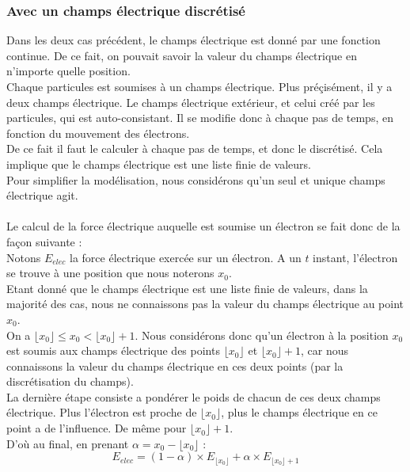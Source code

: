 \documentclass{article}
\begin{document}
\subsubsection{Avec un champs électrique discrétisé}
Dans les deux cas précédent, le champs électrique est donné par une fonction continue. De ce fait, on pouvait savoir la valeur du champs électrique en n'importe quelle position.\\
Chaque particules est soumises à un champs électrique. Plus préçisément, il y a deux champs électrique. Le champs électrique extérieur, et celui créé par les particules, qui est auto-consistant. Il se modifie donc à chaque pas de temps, en fonction du mouvement des électrons.\\
De ce fait il faut le calculer à chaque pas de temps, et donc le discrétisé. Cela implique que le champs électrique est une liste finie de valeurs.\\
Pour simplifier la modélisation, nous considérons qu'un seul et unique champs électrique agit.\\
\\
Le calcul de la force électrique auquelle est soumise un électron se fait donc de la façon suivante :\\
Notons $E_{elec}$ la force électrique exercée sur un électron. A un $t$ instant, l'électron se trouve à une position que nous noterons $x_0$.\\
Etant donné que le champs électrique est une liste finie de valeurs, dans la majorité des cas, nous ne connaissons pas la valeur du champs électrique au point $x_0$.\\
On a $\lfloor x_0 \rfloor \leq x_0 < \lfloor x_0 \rfloor + 1$. Nous considérons donc qu'un électron à la position $x_0$ est soumis aux champs électrique des points $\lfloor x_0 \rfloor$ et $\lfloor x_0 \rfloor + 1$, car nous connaissons la valeur du champs électrique en ces deux points (par la discrétisation du champs).\\
La dernière étape consiste a pondérer le poids de chacun de ces deux champs électrique. Plus l'électron est proche de $\lfloor x_0 \rfloor$, plus le champs électrique en ce point a de l'influence. De même pour $\lfloor x_0 \rfloor + 1$.\\
D'où au final, en prenant $\alpha = x_0 - \lfloor x_0 \rfloor$ :
$$E_{elec} = (1 - \alpha) \times E_{\lfloor x_0 \rfloor} + \alpha \times E_{\lfloor x_0 \rfloor + 1}$$
\begin{center}
\end{center}
\end{document}

